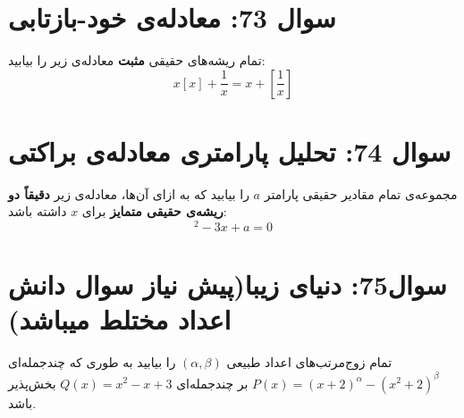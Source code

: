 \documentclass[12pt]{article}
\begin{document}
	
	
	\vspace{1cm}
	\hrulefill
	\vspace{1cm}
	
	
	\section*{سوال 73: معادله‌ی خود-بازتابی}
	تمام ریشه‌های حقیقی \textbf{مثبت} معادله‌ی زیر را بیابید:
	\begin{displaymath}
		x[x] + \frac{1}{x} = x + \left[\frac{1}{x}\right]
	\end{displaymath}
	
	
	
	\vspace{1cm}
	\hrulefill
	\vspace{1cm}
	
	\section*{سوال 74: تحلیل پارامتری معادله‌ی براکتی}
	مجموعه‌ی تمام مقادیر حقیقی پارامتر \(a\) را بیابید که به ازای آن‌ها، معادله‌ی زیر \textbf{دقیقاً دو ریشه‌ی حقیقی متمایز} برای \(x\) داشته باشد:
	\begin{displaymath}
		[x]^2 - 3x + a = 0
	\end{displaymath}
	
	
	
	\vspace{1cm}
	\hrulefill
	\vspace{1cm}
	
	

	\section*{سوال75: دنیای زیبا(پیش نیاز سوال دانش اعداد مختلط میباشد)}
	تمام زوج‌مرتب‌های اعداد طبیعی \((\alpha, \beta)\) را بیابید به طوری که چندجمله‌ای \newline\(P(x) = (x + 2)^{\alpha} - (x^2 + 2)^{\beta}\) بر چندجمله‌ای \(Q(x) = x^2 - x + 3\) بخش‌پذیر باشد.
	
\end{document}
